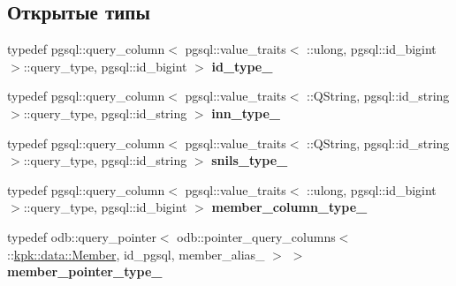 \subsection*{Открытые типы}
\begin{DoxyCompactItemize}
\item 
typedef pgsql\+::query\+\_\+column$<$ pgsql\+::value\+\_\+traits$<$ \+::ulong, pgsql\+::id\+\_\+bigint $>$\+::query\+\_\+type, pgsql\+::id\+\_\+bigint $>$ {\bfseries id\+\_\+type\+\_\+}\hypertarget{structodb_1_1query__columns_3_01_1_1kpk_1_1data_1_1_person_00_01id__pgsql_00_01_a_01_4_a2f1d9ba3452c554416bff4a1a6df6eea}{}\label{structodb_1_1query__columns_3_01_1_1kpk_1_1data_1_1_person_00_01id__pgsql_00_01_a_01_4_a2f1d9ba3452c554416bff4a1a6df6eea}

\item 
typedef pgsql\+::query\+\_\+column$<$ pgsql\+::value\+\_\+traits$<$ \+::Q\+String, pgsql\+::id\+\_\+string $>$\+::query\+\_\+type, pgsql\+::id\+\_\+string $>$ {\bfseries inn\+\_\+type\+\_\+}\hypertarget{structodb_1_1query__columns_3_01_1_1kpk_1_1data_1_1_person_00_01id__pgsql_00_01_a_01_4_a197ec4254a29d5ac6c1dae8858959f34}{}\label{structodb_1_1query__columns_3_01_1_1kpk_1_1data_1_1_person_00_01id__pgsql_00_01_a_01_4_a197ec4254a29d5ac6c1dae8858959f34}

\item 
typedef pgsql\+::query\+\_\+column$<$ pgsql\+::value\+\_\+traits$<$ \+::Q\+String, pgsql\+::id\+\_\+string $>$\+::query\+\_\+type, pgsql\+::id\+\_\+string $>$ {\bfseries snils\+\_\+type\+\_\+}\hypertarget{structodb_1_1query__columns_3_01_1_1kpk_1_1data_1_1_person_00_01id__pgsql_00_01_a_01_4_af49528626f4c0ca22f25599487502d8e}{}\label{structodb_1_1query__columns_3_01_1_1kpk_1_1data_1_1_person_00_01id__pgsql_00_01_a_01_4_af49528626f4c0ca22f25599487502d8e}

\item 
typedef pgsql\+::query\+\_\+column$<$ pgsql\+::value\+\_\+traits$<$ \+::ulong, pgsql\+::id\+\_\+bigint $>$\+::query\+\_\+type, pgsql\+::id\+\_\+bigint $>$ {\bfseries member\+\_\+column\+\_\+type\+\_\+}\hypertarget{structodb_1_1query__columns_3_01_1_1kpk_1_1data_1_1_person_00_01id__pgsql_00_01_a_01_4_aff6760b81959ce5f3b7eb882aa4e7e6e}{}\label{structodb_1_1query__columns_3_01_1_1kpk_1_1data_1_1_person_00_01id__pgsql_00_01_a_01_4_aff6760b81959ce5f3b7eb882aa4e7e6e}

\item 
typedef odb\+::query\+\_\+pointer$<$ odb\+::pointer\+\_\+query\+\_\+columns$<$ \+::\hyperlink{classkpk_1_1data_1_1_member}{kpk\+::data\+::\+Member}, id\+\_\+pgsql, member\+\_\+alias\+\_\+ $>$ $>$ {\bfseries member\+\_\+pointer\+\_\+type\+\_\+}\hypertarget{structodb_1_1query__columns_3_01_1_1kpk_1_1data_1_1_person_00_01id__pgsql_00_01_a_01_4_aa35f98de43aece96beee30be965aba1c}{}\label{structodb_1_1query__columns_3_01_1_1kpk_1_1data_1_1_person_00_01id__pgsql_00_01_a_01_4_aa35f98de43aece96beee30be965aba1c}

\end{DoxyCompactItemize}
